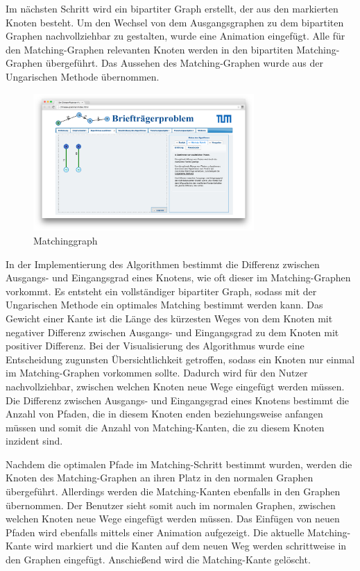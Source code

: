 Im nächsten Schritt wird ein bipartiter Graph erstellt, der aus den markierten Knoten besteht. Um den Wechsel von dem Ausgangsgraphen zu dem bipartiten Graphen nachvollziehbar zu gestalten, wurde eine Animation eingefügt. Alle für den Matching-Graphen relevanten Knoten werden in den bipartiten Matching-Graphen übergeführt. Das Aussehen des Matching-Graphen wurde aus der Ungarischen Methode übernommen. 

\begin{figure}[h!]
	\centering
	\includegraphics[width=0.75\textwidth]{figures/postman_matching}
	\caption[Chinese-Postman: Matchinggraph]{Matchinggraph}\label{fig:postman_matching}
\end{figure}

In der Implementierung des Algorithmen bestimmt die Differenz zwischen Ausgangs- und Eingangsgrad eines Knotens, wie oft dieser im Matching-Graphen vorkommt. Es entsteht ein vollständiger bipartiter Graph, sodass mit der Ungarischen Methode ein optimales Matching bestimmt werden kann. Das Gewicht einer Kante ist die Länge des kürzesten Weges von dem Knoten mit negativer Differenz zwischen Ausgangs- und Eingangsgrad zu dem Knoten mit positiver Differenz. Bei der Visualisierung des Algorithmus wurde eine Entscheidung zugunsten Übersichtlichkeit getroffen, sodass ein Knoten nur einmal im Matching-Graphen vorkommen sollte. Dadurch wird für den Nutzer nachvollziehbar, zwischen welchen Knoten neue Wege eingefügt werden müssen. Die Differenz zwischen Ausgangs- und Eingangsgrad eines Knotens bestimmt die Anzahl von Pfaden, die in diesem Knoten enden beziehungsweise anfangen müssen und somit die Anzahl von Matching-Kanten, die zu diesem Knoten inzident sind.

Nachdem die optimalen Pfade im Matching-Schritt bestimmt wurden, werden die Knoten des Matching-Graphen an ihren Platz in den normalen Graphen übergeführt. Allerdings werden die Matching-Kanten ebenfalls in den Graphen übernommen. Der Benutzer sieht somit auch im normalen Graphen, zwischen welchen Knoten neue Wege eingefügt werden müssen.
Das Einfügen von neuen Pfaden wird ebenfalls mittels einer Animation aufgezeigt. Die aktuelle Matching-Kante wird markiert und die Kanten auf dem neuen Weg werden schrittweise in den Graphen eingefügt. Anschießend wird die Matching-Kante gelöscht.

